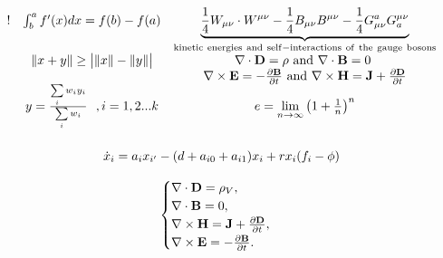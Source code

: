 \documentclass[12pt, a4paper, oneside]{ctexart}
\begin{document}
\begin{gather*}
    \begin{array}{ c c c }
        ! & \int _{b}^{a} f'( x) dx=f( b) -f( a)                                         & \underbrace{\frac{1}{4} W_{\mu \nu } \cdot W^{\mu \nu } -\frac{1}{4} B_{\mu \nu } B^{\mu \nu } -\frac{1}{4} G_{\mu \nu }^{a} G_{a}^{\mu \nu }}_{\mathrm{kinetic\ energies\ and\ self-interactions\ of\ the\ gauge\ bosons}} \\
          & \Vert x+y\Vert \geq \bigl|\Vert x\Vert -\Vert y\Vert \bigr|                  & \nabla \cdot \mathbf{D} =\rho \ \mathrm{and} \ \nabla \cdot \mathbf{B} =0\                                                                                                                                                  \\
          &                                                                              & \nabla \times \mathbf{E} =-\frac{\partial \mathbf{B}}{\partial t} \ \mathrm{and} \ \nabla \times \mathbf{H} =\mathbf{J} +\frac{\partial \mathbf{D}}{\partial t}                                                             \\
          & y=\frac{\sum\limits _{i} w_{i} y_{i}}{\sum\limits _{i} w_{i}} \ \ ,i=1,2...k & e=\lim\limits _{n\rightarrow \infty }\left( 1+\frac{1}{n}\right)^{n}                                                                                                                                                        \\
          &                                                                              &
    \end{array}\\
    \dot{x}_{i} =a_{i} x_{i'} -( d+a_{i0} +a_{i1}) x_{i} +rx_{i}( f_{i} -\phi )
\end{gather*}

\begin{equation}
    \begin{cases}
        \nabla \cdot \mathbf{D} = {\rho}_{V},                                         \\
        \nabla \cdot \mathbf{B} = 0,                                                  \\
        \nabla \times \mathbf{H} = \mathbf{J} +  {\partial\mathbf{D}\over\partial t}, \\
        \nabla \times \mathbf{E} = - {\partial\mathbf{B}\over\partial t}.
    \end{cases}
\end{equation}
\end{document}
